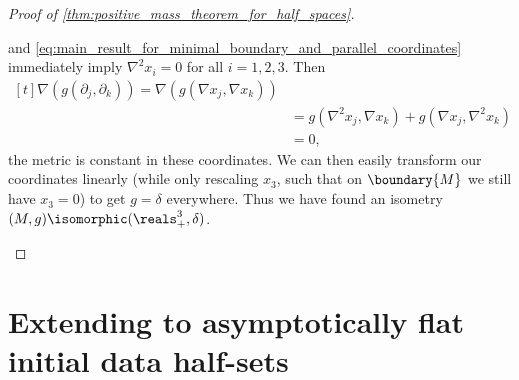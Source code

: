 \documentclass[titlepage,numbers=noenddot,headinclude,oneside,%
footinclude=true,cleardoublepage=empty,%
BCOR=5mm,paper=a4,fontsize=11pt,%
english,%
]{scrartcl}
\begin{document}
\begin{proof}[Proof of \cref{thm:positive_mass_theorem_for_half_spaces}]
\begin{proofdescription}
         and \cref{eq:main_result_for_minimal_boundary_and_parallel_coordinates} immediately imply \( \nabla^2 x_i=0 \) for all \( i=1,2,3 \). Then
        \begin{equation*}
            \begin{aligned}[t]
                \nabla (g(\partial_j,\partial_k))=\nabla(g(\nabla x_j,\nabla x_k))\\
                &=g(\nabla^2 x_j,\nabla x_k)+g(\nabla x_j,\nabla^2 x_k)\\
                &=0,
            \end{aligned}
        \end{equation*}
        \ie the metric is constant in these coordinates. We can then easily transform our coordinates linearly (while only rescaling \( x_3 \), such that on \( \boundary{M} \) we still have \( x_3=0 \)) to get \( g=\delta \) everywhere. Thus we have found an isometry \( (M,g)\isomorphic (\reals^3_+,\delta) \).
    \end{proofdescription}
\end{proof}
\section{Extending to asymptotically flat initial data half-sets}





\newpage
\appendix
\end{document}
